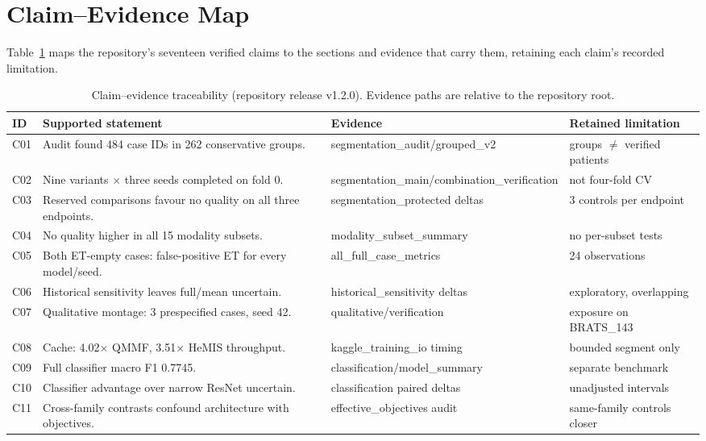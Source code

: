\section{Claim--Evidence Map}
\label{app:claims}

Table~\ref{tab:claims} maps the repository's seventeen verified claims to the sections and evidence that carry them, retaining each claim's recorded limitation.

\begin{table}[tp]
\centering
\scriptsize
\caption{Claim--evidence traceability (repository release v1.2.0). Evidence paths are relative to the repository root.}
\label{tab:claims}
\begin{tabular}{lp{5.6cm}lp{4.2cm}}
\toprule
ID & Supported statement & Evidence & Retained limitation \\
\midrule
C01 & Audit found 484 case IDs in 262 conservative groups. & segmentation\_audit/grouped\_v2 & groups $\ne$ verified patients \\
C02 & Nine variants $\times$ three seeds completed on fold 0. & segmentation\_main/combination\_verification & not four-fold CV \\
C03 & Reserved comparisons favour no quality on all three endpoints. & segmentation\_protected deltas & 3 controls per endpoint \\
C04 & No quality higher in all 15 modality subsets. & modality\_subset\_summary & no per-subset tests \\
C05 & Both ET-empty cases: false-positive ET for every model/seed. & all\_full\_case\_metrics & 24 observations \\
C06 & Historical sensitivity leaves full/mean uncertain. & historical\_sensitivity deltas & exploratory, overlapping \\
C07 & Qualitative montage: 3 prespecified cases, seed 42. & qualitative/verification & exposure on BRATS\_143 \\
C08 & Cache: 4.02$\times$ QMMF, 3.51$\times$ HeMIS throughput. & kaggle\_training\_io timing & bounded segment only \\
C09 & Full classifier macro F1 0.7745. & classification/model\_summary & separate benchmark \\
C10 & Classifier advantage over narrow ResNet uncertain. & classification paired deltas & unadjusted intervals \\
C11 & Cross-family contrasts confound architecture with objectives. & effective\_objectives audit & same-family controls closer \\

\end{tabular}
\end{table}
